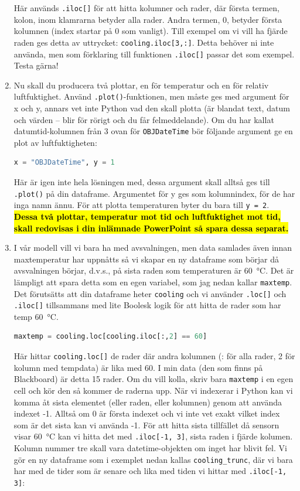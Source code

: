 \documentclass{article}
\begin{document}
\begin{enumerate}
    Här används \texttt{.iloc[]} för att hitta kolumner och rader, där första termen, kolon, inom klamrarna betyder alla rader. Andra termen, 0, betyder första kolumnen (index startar på 0 som vanligt). Till exempel om vi vill ha fjärde raden ges detta av uttrycket: \texttt{cooling.iloc[3,:]}.   Detta behöver ni inte använda, men som förklaring till funktionen \texttt{.iloc[]} passar det som exempel. Testa gärna!
    \item Nu skall du producera två plottar, en för temperatur och en för relativ luftfuktighet. Använd \texttt{.plot()}-funktionen, men måste ges med argument för x och y, annars vet inte Python vad den skall plotta (är blandat text, datum och värden – blir för rörigt och du får felmeddelande). Om du har kallat datumtid-kolumnen från 3 ovan för \texttt{OBJDateTime} bör följande argument ge en plot av luftfuktigheten:
    \begin{lstlisting}[language=Python]
x = "OBJDateTime", y = 1
\end{lstlisting}
    Här är igen inte hela lösningen med, dessa argument skall alltså ges till \texttt{.plot()} på din dataframe. Argumentet för y ges som kolumnindex, för de har inga namn ännu. För att plotta temperaturen byter du bara till \texttt{y = 2}. \hl{\textbf{Dessa två plottar, temperatur mot tid och luftfuktighet mot tid, skall redovisas i din inlämnade PowerPoint så spara dessa separat.}}
    \item I vår modell vill vi bara ha med avsvalningen, men data samlades även innan maxtemperatur har uppnåtts så vi skapar en ny dataframe som börjar då avsvalningen börjar, d.v.s., på sista raden som temperaturen är \SI{60}{\celsius}. Det är lämpligt att spara detta som en egen variabel, som jag nedan kallar \texttt{maxtemp}. Det förutsätts att din dataframe heter \texttt{cooling} och vi använder \texttt{.loc[]} och \texttt{.iloc[]} tillsammans med lite Boolesk logik för att hitta de rader som har temp \qty{60}{\celsius}.
    \begin{lstlisting}[language=Python]
maxtemp = cooling.loc[cooling.iloc[:,2] == 60]
\end{lstlisting}
    Här hittar \texttt{cooling.loc[]} de rader där andra kolumnen (: för alla rader, 2 för kolumn med tempdata) är lika med 60. I min data (den som finns på Blackboard) är detta 15 rader. Om du vill kolla, skriv bara \texttt{maxtemp} i en egen cell och kör den så kommer de raderna upp.
    När vi indexerar i Python kan vi komma åt sista elementet (eller raden, eller kolumnen) genom att använda indexet -1. Alltså om 0 är första indexet och vi inte vet exakt vilket index som är det sista kan vi använda -1. För att hitta sista tillfället då sensorn visar \SI{60}{\celsius} kan vi hitta det med \texttt{.iloc[-1, 3]}, sista raden i fjärde kolumen. Kolumn nummer tre skall vara datetime-objekten om inget har blivit fel. Vi gör en ny dataframe som i exemplet nedan kallas \texttt{cooling\_trunc}, där vi bara har med de tider som är senare och lika med tiden vi hittar med \texttt{.iloc[-1, 3]}:

\end{enumerate}
\end{document}
